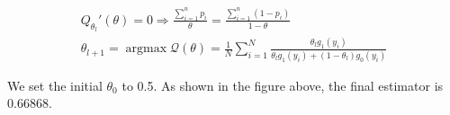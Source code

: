 \documentclass{article}
\begin{document}
\begin{equation*}
    \begin{align*}
       Q_{\theta_l}'(\theta)=0\Longrightarrow \frac{\sum_{i=1}^n p_i}{\theta} = \frac{\sum_{i=1}^n (1-p_i) }{1-\theta}
    \\
    \theta_{l+1}=\operatorname{argmax} \mathscr{Q}(\theta)=\frac{1}{N} \sum_{i=1}^{N} \frac{\theta_l g_1(y_i)}{\theta_l g_1(y_i)+ (1-\theta_l) g_0(y_i)} 
    \end{align*}
    
\end{equation*}
\begin{figure}[H]
\end{figure}

We set the initial $\theta_0$ to 0.5. As shown in the figure above, the final estimator is 0.66868.
\end{document}
